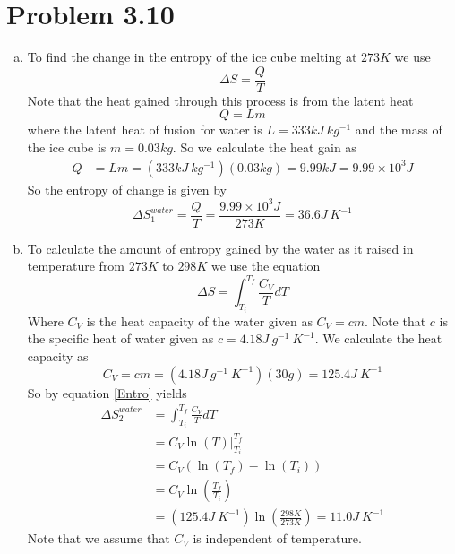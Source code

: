 \documentclass[11pt]{article}
\numberwithin{equation}{section}
\begin{document}
\section{Problem 3.10}
\begin{enumerate}[(a)]
\item
To find the change in the entropy of the ice cube melting at $273\unit{K}$ we use
$$\Delta S = \frac{Q}{T}$$
Note that the heat gained through this process is from the latent heat
$$Q = Lm$$
where the latent heat of fusion for water is $L = 333\unit{kJ\ kg^{-1}}$ and the mass of the ice cube is $m = 0.03\unit{kg}$. So we calculate the heat gain as
\begin{align*}
Q &= Lm = (333\unit{kJ\ kg^{-1}})(0.03\unit{kg}) = 9.99\unit{kJ} = 9.99\times10^{3}\unit{J}
\end{align*}
So the entropy of change is given by
$$\Delta S^{water}_1 = \frac{Q}{T} = \frac{9.99\times10^{3}\unit{J}}{273\unit{K}} = 36.6\unit{J\ K^{-1}}$$

\item
To calculate the amount of entropy gained by the water as it raised in temperature from $273\unit{K}$ to $298\unit{K}$ we use the equation
\begin{equation}
\Delta S = \int_{T_i}^{T_f}\frac{C_V}{T}dT
\label{Entro}
\end{equation}
Where $C_V$ is the heat capacity of the water given as $C_V = cm$. Note that $c$ is the specific heat of water given as $c = 4.18\unit{J\ g^{-1}\ K^{-1}}$. We calculate the heat capacity as
$$C_V = cm = (4.18\unit{J\ g^{-1}\ K^{-1}})(30\unit{g}) = 125.4\unit{J\ K^{-1}}$$
So by equation \ref{Entro} yields
\begin{align*}
\Delta S^{water}_2 &= \int_{T_i}^{T_f}\frac{C_V}{T}dT\\
&= \left.C_V \ln(T)\right|_{T_i}^{T_f}\\
&= C_V\left(\ln(T_f) - \ln(T_i)\right)\\
&= C_V\ln\left(\frac{T_f}{T_i}\right) \\
&= (125.4\unit{J\ K^{-1}})\ln\left(\frac{298\unit{K}}{273\unit{K}}\right) = 11.0\unit{J\ K^{-1}}
\end{align*}
Note that we assume that $C_V$ is independent of temperature.


\end{enumerate}
\end{document}
